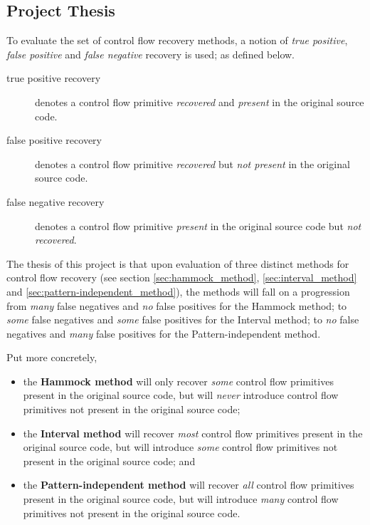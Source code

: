 
\subsection{Project Thesis}


To evaluate the set of control flow recovery methods, a notion of \textit{true positive}, \textit{false positive} and \textit{false negative} recovery is used; as defined below.

\begin{description}
	\item[true positive recovery] denotes a control flow primitive \textit{recovered} and \textit{present} in the original source code.
	\item[false positive recovery] denotes a control flow primitive \textit{recovered} but \textit{not present} in the original source code.
	\item[false negative recovery] denotes a control flow primitive \textit{present} in the original source code but \textit{not recovered}.
\end{description}

The thesis of this project is that upon evaluation of three distinct methods for control flow recovery (see section \ref{sec:hammock_method}, \ref{sec:interval_method} and \ref{sec:pattern-independent_method}), the methods will fall on a progression from \textit{many} false negatives and \textit{no} false positives for the Hammock method; to \textit{some} false negatives and \textit{some} false positives for the Interval method; to \textit{no} false negatives and \textit{many} false positives for the Pattern-independent method.

Put more concretely,
\begin{itemize}
	\item the \textbf{Hammock method} will only recover \textit{some} control flow primitives present in the original source code, but will \textit{never} introduce control flow primitives not present in the original source code;
	\item the \textbf{Interval method} will recover \textit{most} control flow primitives present in the original source code, but will introduce \textit{some} control flow primitives not present in the original source code; and
	\item the \textbf{Pattern-independent method} will recover \textit{all} control flow primitives present in the original source code, but will introduce \textit{many} control flow primitives not present in the original source code.
\end{itemize}
